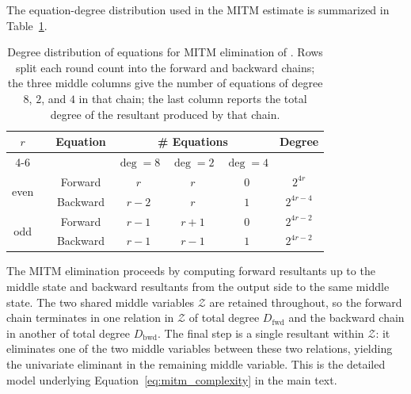 The equation-degree distribution used in the MITM estimate is summarized in Table~\ref{tab:vision_equation_distribution}.
\begin{table}[!htbp]
	\centering
	\caption{Degree distribution of equations for MITM elimination of \vision. Rows split each round count into the forward and backward chains; the three middle columns give the number of equations of degree $8$, $2$, and $4$ in that chain; the last column reports the total degree of the resultant produced by that chain.}
	\label{tab:vision_equation_distribution}
	\begin{tabular}{cc|c|ccc|c}
		\toprule
		\multirow{2}{*}{$r$} & &\multirow{2}{*}{Equation} & \multicolumn{3}{c|}{\# Equations} & \multirow{2}{*}{Degree} \\
		\cmidrule{4-6}
		& & &$\deg =8$ & $\deg =2$ & $\deg =4$ & \\
		\midrule
		\multirow{2}{*}{even} & &Forward & $r$ & $r$ & $0$ & $2^{4r}$ \\
		& &Backward & $r-2$ & $r$ & $1$ & $2^{4r-4}$ \\
		\midrule
		\multirow{2}{*}{odd} &  &Forward & $r-1$ & $r+1$ & $0$ & $2^{4r-2}$ \\
		& & Backward & $r-1$ & $r-1$ & $1$ & $2^{4r-2}$ \\
		\bottomrule
	\end{tabular}
\end{table}

The MITM elimination proceeds by computing forward resultants up to the middle state and backward resultants from the output side to the same middle state. The two shared middle variables $\mathcal{Z}$ are retained throughout, so the forward chain terminates in one relation in $\mathcal{Z}$ of total degree $D_{\mathrm{fwd}}$ and the backward chain in another of total degree $D_{\mathrm{bwd}}$. The final step is a single resultant within $\mathcal{Z}$: it eliminates one of the two middle variables between these two relations, yielding the univariate eliminant in the remaining middle variable. This is the detailed model underlying Equation~\eqref{eq:mitm_complexity} in the main text.

